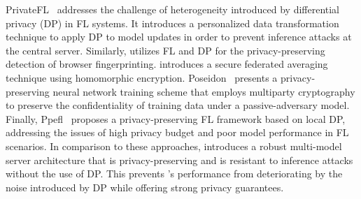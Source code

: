  PrivateFL~\cite{yang2023privatefl} addresses the challenge of heterogeneity introduced by differential privacy (DP) in FL systems. It introduces a personalized data transformation technique to apply DP to model updates in order to prevent inference attacks at the central server. Similarly, \cite{annamalai2023fp} utilizes FL and DP for the privacy-preserving detection of browser fingerprinting. \cite{dasu2022prov} introduces a secure federated averaging technique using homomorphic encryption. Poseidon~\cite{sav2020poseidon} presents a privacy-preserving neural network training scheme that employs multiparty cryptography to preserve the confidentiality of training data under a passive-adversary model. Finally, Ppefl~\cite{wang2023ppefl} proposes a privacy-preserving FL framework based on local DP, addressing the issues of high privacy budget and poor model performance in FL scenarios. In comparison to these approaches, \Sys introduces a robust multi-model server architecture that is privacy-preserving and is resistant to inference attacks without the use of DP. This prevents \Sys's performance from deteriorating by the noise introduced by DP while offering strong privacy guarantees.
 










